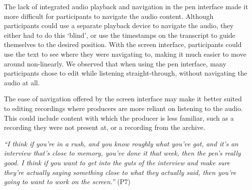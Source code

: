 The lack of integrated audio playback and navigation in the pen interface made it more difficult for participants to
navigate the audio content.  Although participants could use a separate playback device to navigate the audio,
they either had to do this `blind', or use the timestamps on the transcript to guide themselves to the desired
position. With the screen interface, participants could use the text to see where they were navigating to, making it
much easier to move around non-linearly.  We observed that when using the pen interface, many participants chose to
edit while listening straight-through, without navigating the audio at all.

The ease of navigation offered by the screen interface may make it better suited to editing recordings where producers
are more reliant on listening to the audio. This could include content with which the producer is less familiar, such
as a recording they were not present at, or a recording from the archive.

\textit{``I think if you're in a rush, and you know roughly what you've got, and it's an interview that's close to
  memory, you've done it that week, then the pen's really good. I think if you want to get into the guts of the interview
  and make sure they're actually saying something close to what they actually said, then you're going to want to work on
the screen.''} (P7)






